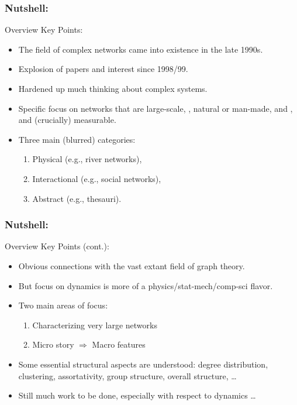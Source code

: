 \begin{frame}[label=]
  \frametitle{Nutshell:}

  \begin{block}{Overview Key Points:}
    \begin{itemize}
    \item<1->
      The field of complex networks came into
      existence in the late 1990s.
    \item<2->
      Explosion of papers and interest since 1998/99.
    \item<3->
      Hardened up much thinking about complex systems.
    \item<4->
      Specific focus on networks that are 
      \alert{large-scale}, 
      , 
      \alert{natural} or \alert{man-made}, 
       and , 
      and 
      (crucially) \alert{measurable}.
    \item<5->
      Three main (blurred) categories: 
      \begin{enumerate}
      \item 
      \alert{Physical} (e.g., river networks),
      \item 
      \alert{Interactional} (e.g., social networks),
      \item 
      \alert{Abstract} (e.g., thesauri).
      \end{enumerate}
    \end{itemize}
    
  \end{block}

\end{frame}

\begin{frame}[label=]
  \frametitle{Nutshell:}

  \begin{block}{Overview Key Points (cont.):}
    \begin{itemize}
    \item<1->
      Obvious connections with the vast
      extant field of graph theory.
    \item<2->
      But focus on dynamics is more of a physics/stat-mech/comp-sci
      flavor.
    \item<3->
      Two main areas of focus:
      \begin{enumerate}
      \item 
         Characterizing very large networks
      \item
         Micro story $\Rightarrow$ Macro features
      \end{enumerate}
    \item<4->
      Some essential structural aspects are understood: degree distribution, clustering,
      assortativity, group structure, overall structure, \ldots
    \item<5->
      Still much work to be done, especially with respect to dynamics \ldots
    \end{itemize}
    
  \end{block}

\end{frame}


